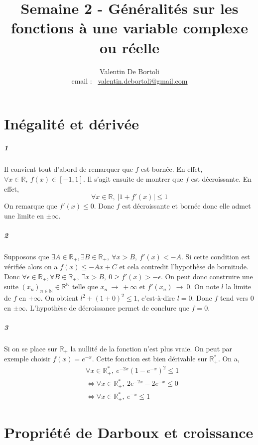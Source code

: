 \documentclass[10pt,a4paper]{article}
\title{Semaine 2 - Généralités sur les fonctions à une variable complexe ou réelle}
\author{Valentin De Bortoli \\ email : \ \href{mailto:valentin.debortoli@gmail.com}{valentin.debortoli@gmail.com}}
\date{}
\begin{document}
\maketitle

\section{Inégalité et dérivée}

\subparagraph{1}Il convient tout d'abord de remarquer que $f$ est bornée. En effet, $\forall x \in \mathbb{R}, \ f(x) \in [-1,1]$. Il s'agit ensuite de montrer que $f$ est décroissante. En effet,
\begin{equation}
\forall x \in \mathbb{R}, \ \vert 1+f'(x) \vert \le 1
\end{equation}
On remarque que $f'(x) \le 0$. Donc $f$ est décroissante et bornée donc elle admet une limite en $\pm \infty$.

\subparagraph{2} Supposons que $\exists A \in \mathbb{R}_+, \exists B \in \mathbb{R}_+, \ \forall x>B, \ f'(x)<-A$. Si cette condition est vérifiée alors on a $f(x) \le -Ax +C$ et cela contredit l'hypothèse de bornitude. Donc $\forall \epsilon \in \mathbb{R}_+, \forall B \in \mathbb{R}_+, \ \exists x>B, \ 0 \ge f'(x)>-\epsilon$. On peut donc construire une suite $(x_n)_{n \in \mathbb{N}} \in \mathbb{R}^{\mathbb{N}}$ telle que $x_n \ \rightarrow \ +\infty$ et $f'(x_n) \ \rightarrow \ 0$. On note $l$ la limite de $f$ en $+\infty$. On obtient $l^2 + (1+0)^2 \le 1$, c'est-à-dire $l=0$. Donc $f$ tend vers $0$ en $\pm \infty$. L'hypothèse de décroissance permet de conclure que $f=0$.

\subparagraph{3}Si on se place sur $\mathbb{R}_+$ la nullité de la fonction n'est plus vraie. On peut par exemple choisir $f(x) = e^{-x}$. Cette fonction est bien dérivable sur $\mathbb{R}_+^*$. On a,
\begin{equation}
\begin{aligned}
&\forall x \in \mathbb{R}_+^*, \ e^{-2x} (1-e^{-x})^2 \le 1 \\
&\Leftrightarrow \forall x \in \mathbb{R}_+^*, \ 2e^{-2x} -2e^{-x} \le 0 \\
&\Leftrightarrow \forall x \in \mathbb{R}_+^*, \ e^{-x} \le 1
\end{aligned}
\end{equation}

\section{Propriété de Darboux et croissance}
\end{document}
